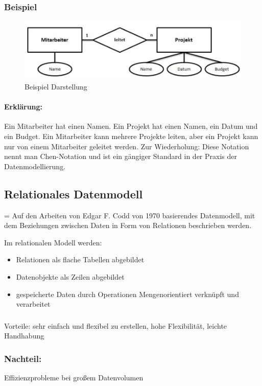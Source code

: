 \subsubsection{Beispiel}

\begin{figure}[H]
    \centering
    \includegraphics[width=.4\textwidth]{Content/images/modellierung/bsp.png}
    \caption{Beispiel Darstellung}
    \label{fig:modellierung:bsp}
\end{figure}

\paragraph{Erklärung:}
Ein Mitarbeiter hat einen Namen. Ein Projekt hat einen Namen, ein Datum und ein Budget. Ein Mitarbeiter kann mehrere Projekte leiten, aber ein Projekt kann nur von einem Mitarbeiter geleitet werden. 
Zur Wiederholung: Diese Notation nennt man Chen-Notation und ist ein gängiger Standard in der Praxis der Datenmodellierung.

 \subsection{Relationales Datenmodell}

 = Auf den Arbeiten von Edgar F. Codd von 1970 basierendes Datenmodell, mit dem Beziehungen zwischen Daten in Form von Relationen beschrieben werden. 

Im relationalen Modell werden:
\begin{itemize}
    \item Relationen als flache Tabellen abgebildet
    \item Datenobjekte als Zeilen abgebildet
    \item gespeicherte Daten durch Operationen Mengenorientiert verknüpft und verarbeitet
\end{itemize}

\subsubsection{}{Vorteile:} sehr einfach und flexibel zu erstellen, hohe Flexibilität, leichte Handhabung
\subsubsection{Nachteil:} Effizienzprobleme bei großem Datenvolumen


